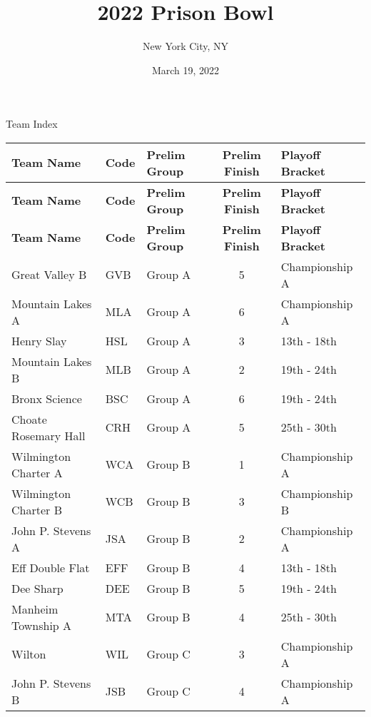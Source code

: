 \documentclass{article}%
\title{2022 Prison Bowl}%
\author{New York City, NY}%
\date{March 19, 2022}%
\begin{document}
%
\normalsize%
%
\maketitle%
\vspace*{48pt}%
\begin{center}%
\begin{Huge}%
Team Index%
\end{Huge}%
\end{center}%
\newpage%
\pagestyle{fancy}%
\fancyhf{}%
%
%
%
%
%
\begin{longtable}{|ll|lc|l|}%
\rowcolor{gray!30}%
\hline%
\textbf{Team Name} & \textbf{Code}&\textbf{Prelim Group}&\textbf{Prelim Finish}&\textbf{Playoff Bracket}\\%
\hline%
\endhead%
\hline%
\rowcolor{gray!25}%
\textbf{Team Name} & \textbf{Code}&\textbf{Prelim Group}&\textbf{Prelim Finish}&\textbf{Playoff Bracket}\\%
\hline%
\endfoot%
\hline%
\hline\rowcolor{gray!25}%
\textbf{Team Name} & \textbf{Code}&\textbf{Prelim Group}&\textbf{Prelim Finish}&\textbf{Playoff Bracket}\\%
\hline%
\endlastfoot%
\hline%
Great Valley B&GVB&Group A&5&Championship A\\%
Mountain Lakes A&MLA&Group A&6&Championship A\\%
Henry Slay&HSL&Group A&3&13th {-} 18th\\%
Mountain Lakes B&MLB&Group A&2&19th {-} 24th\\%
Bronx Science&BSC&Group A&6&19th {-} 24th\\%
Choate Rosemary Hall&CRH&Group A&5&25th {-} 30th\\%
Wilmington Charter A&WCA&Group B&1&Championship A\\%
Wilmington Charter B&WCB&Group B&3&Championship B\\%
John P. Stevens A&JSA&Group B&2&Championship A\\%
Eff Double Flat&EFF&Group B&4&13th {-} 18th\\%
Dee Sharp&DEE&Group B&5&19th {-} 24th\\%
Manheim Township A&MTA&Group B&4&25th {-} 30th\\%
Wilton&WIL&Group C&3&Championship A\\%
John P. Stevens B&JSB&Group C&4&Championship A\\%

\end{longtable}
\end{document}
